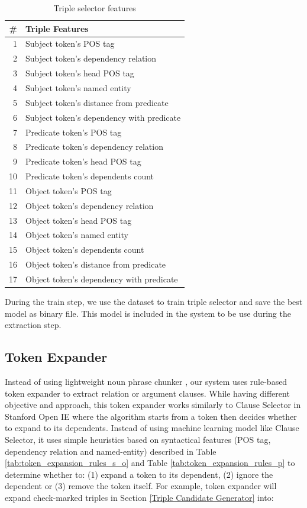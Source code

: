\begin{table}[!t]
\renewcommand{\arraystretch}{1.5}
\caption{Triple selector features}
\label{tab:models_features}
\centering
\begin{tabular}{r l}
\hline
\textbf{\#} & \textbf{Triple Features} \\
\hline
1 & Subject token's POS tag \\
2 & Subject token's dependency relation \\
3 & Subject token's head POS tag \\
4 & Subject token's named entity \\
5 & Subject token's distance from predicate \\
6 & Subject token's dependency with predicate \\
7 & Predicate token's POS tag \\
8 & Predicate token's dependency relation \\
9 & Predicate token's head POS tag \\
10 & Predicate token's dependents count \\
11 & Object token's POS tag \\
12 & Object token's dependency relation \\
13 & Object token's head POS tag \\
14 & Object token's named entity \\
15 & Object token's dependents count \\
16 & Object token's distance from predicate \\
17 & Object token's dependency with predicate \\
\end{tabular}
\end{table}

During the train step, we use the dataset to train triple selector and save the best model as binary file. This model is included in the system to be use during the extraction step.

\subsection{Token Expander}

Instead of using lightweight noun phrase chunker \citep{banko2007open}, our system uses rule-based token expander to extract relation or argument clauses. While having different objective and approach, this token expander works similarly to Clause Selector in Stanford Open IE \citep{angeli2015leveraging} where the algorithm starts from a token then decides whether to expand to its dependents. Instead of using machine learning model like Clause Selector, it uses simple heuristics based on syntactical features (POS tag, dependency relation and named-entity) described in Table \ref{tab:token_expansion_rules_s_o} and Table \ref{tab:token_expansion_rules_p} to determine whether to: (1) expand a token to its dependent, (2) ignore the dependent or (3) remove the token itself. For example, token expander will expand check-marked triples in Section \ref{Triple Candidate Generator} into:

